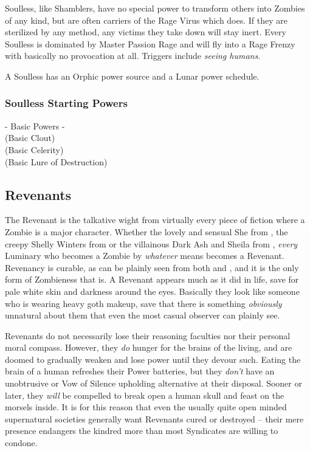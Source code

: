 Soulless, like Shamblers, have no special power to transform others into Zombies of any kind, but are often carriers of the Rage Virus which does. If they are sterilized by any method, any victims they take down will stay inert. Every Soulless is dominated by Master Passion Rage and will fly into a Rage Frenzy with basically no provocation at all. Triggers include \textit{seeing humans}.

A Soulless has an Orphic power source and a Lunar power schedule.

\subsubsection{Soulless Starting Powers}

\hspace{\parindent} - Basic Powers -\\
 (Basic Clout)\\
 (Basic Celerity)\\
 (Basic Lure of Destruction)

\subsection{Revenants} 

The Revenant is the talkative wight from virtually every piece of fiction where a Zombie is a major character. Whether the lovely and sensual She from , the creepy Shelly Winters from  or the villainous Dark Ash and Sheila from , \textit{every} Luminary who becomes a Zombie by \textit{whatever} means becomes a Revenant. Revenancy is curable, as can be plainly seen from both  and , and it is the only form of Zombieness that is. A Revenant appears much as it did in life, save for pale white skin and darkness around the eyes. Basically they look like someone who is wearing heavy goth makeup, save that there is something \textit{obviously} unnatural about them that even the most casual observer can plainly see.

Revenants do not necessarily lose their reasoning faculties nor their personal moral compass. However, they \textit{do} hunger for the brains of the living, and are doomed to gradually weaken and lose power until they devour such. Eating the brain of a human refreshes their Power batteries, but they \textit{don't} have an unobtrusive or Vow of Silence upholding alternative at their disposal. Sooner or later, they \textit{will} be compelled to break open a human skull and feast on the morsels inside. It is for this reason that even the usually quite open minded supernatural societies generally want Revenants cured or destroyed -- their mere presence endangers the kindred more than most Syndicates are willing to condone.

